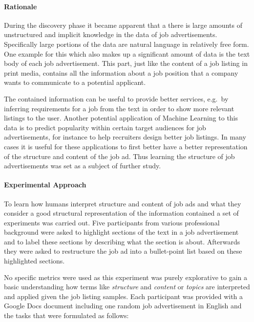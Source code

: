 \paragraph{Rationale}
\label{par:Rationale (Inferring Structure of Job Advertisements)}

During the discovery phase it became apparent that a there is large amounts of unstructured and implicit knowledge in the data of job advertisements. Specifically large portions of the data are natural language in relatively free form. One example for this which also makes up a significant amount of data is the text body of each job advertisement. This part, just like the content of a job listing in print media, contains all the information about a job position that a company wants to communicate to a potential applicant.

The contained information can be useful to provide better services, e.g.\ by inferring requirements for a job from the text in order to show more relevant listings to the user. Another potential application of \gls{Machine Learning} to this data is to predict popularity within certain target audiences for job advertisements, for instance to help recruiters design better job listings. In many cases it is useful for these applications to first better have a better representation of the structure and content of the job ad. Thus learning the structure of job advertisements was set as a subject of further study.

\paragraph{Experimental Approach}
\label{par:Experimental Approach and Metrics}

To learn how humans interpret structure and content of job ads and what they consider a good structural representation of the information contained a set of experiments was carried out. Five participants from various professional background were asked to highlight sections of the text in a job advertisement and to label these sections by describing what the section is about. Afterwards they were asked to restructure the job ad into a bullet-point list based on these highlighted sections.

No specific metrics were used as this experiment was purely explorative to gain a basic understanding how terms like \emph{structure} and \emph{content} or \emph{topics} are interpreted and applied given the job listing samples. Each participant was provided with a \gls{Google Docs} document including one random job advertisement in English and the tasks that were formulated as follows:

